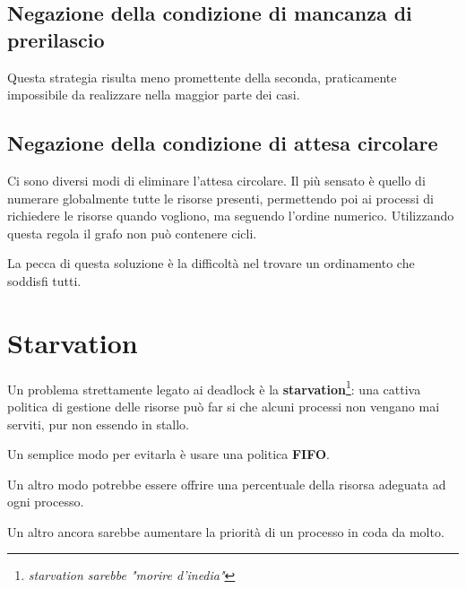 \subsection{Negazione della condizione di mancanza di prerilascio}
Questa strategia risulta meno promettente della seconda, praticamente impossibile da realizzare nella maggior parte dei casi.


\subsection{Negazione della condizione di attesa circolare}
Ci sono diversi modi di eliminare l'attesa circolare. Il più sensato è quello di numerare globalmente tutte le risorse presenti, permettendo poi ai processi di richiedere le risorse quando vogliono, ma seguendo l'ordine numerico. Utilizzando questa regola il grafo non può contenere cicli.

La pecca di questa soluzione è la difficoltà nel trovare un ordinamento che soddisfi tutti.

\paragraph*{}
\section{Starvation}
Un problema strettamente legato ai deadlock è la \textbf{starvation}\footnote{\textit{starvation sarebbe "morire d'inedia"}}: una cattiva politica di gestione delle risorse può far si che alcuni processi non vengano mai serviti, pur non essendo in stallo. 

Un semplice modo per evitarla è usare una politica \textbf{FIFO}.

Un altro modo potrebbe essere offrire una percentuale della risorsa adeguata ad ogni processo.

Un altro ancora sarebbe aumentare la priorità di un processo in coda da molto.